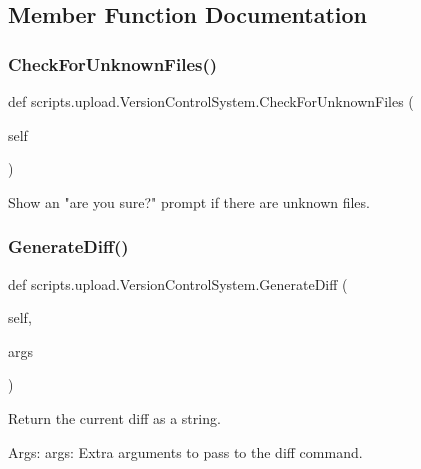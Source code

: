 \subsection{Member Function Documentation}
\mbox{\label{classscripts_1_1upload_1_1_version_control_system_af5b69f633b49f4c56538cf705c1bba07}} 
\subsubsection{\texorpdfstring{CheckForUnknownFiles()}{CheckForUnknownFiles()}}
{\footnotesize\ttfamily def scripts.\+upload.\+Version\+Control\+System.\+Check\+For\+Unknown\+Files (\begin{DoxyParamCaption}\item[{}]{self }\end{DoxyParamCaption})}

\begin{DoxyVerb}Show an "are you sure?" prompt if there are unknown files.\end{DoxyVerb}
 \mbox{\label{classscripts_1_1upload_1_1_version_control_system_ac687c3bb7840db1b27f323ca8d63c89b}} 
\subsubsection{\texorpdfstring{GenerateDiff()}{GenerateDiff()}}
{\footnotesize\ttfamily def scripts.\+upload.\+Version\+Control\+System.\+Generate\+Diff (\begin{DoxyParamCaption}\item[{}]{self,  }\item[{}]{args }\end{DoxyParamCaption})}

\begin{DoxyVerb}Return the current diff as a string.

Args:
  args: Extra arguments to pass to the diff command.
\end{DoxyVerb}
 

